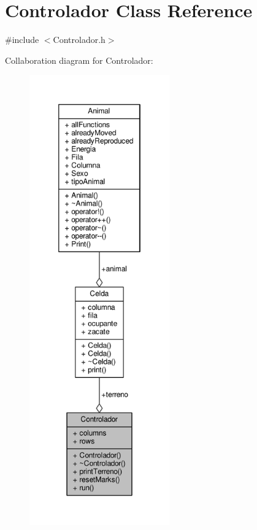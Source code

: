 \hypertarget{classControlador}{}\section{Controlador Class Reference}
\label{classControlador}


{\ttfamily \#include $<$Controlador.\+h$>$}



Collaboration diagram for Controlador\+:\nopagebreak
\begin{figure}[H]
\begin{center}
\leavevmode
\includegraphics[height=550pt]{classControlador__coll__graph}
\end{center}
\end{figure}
